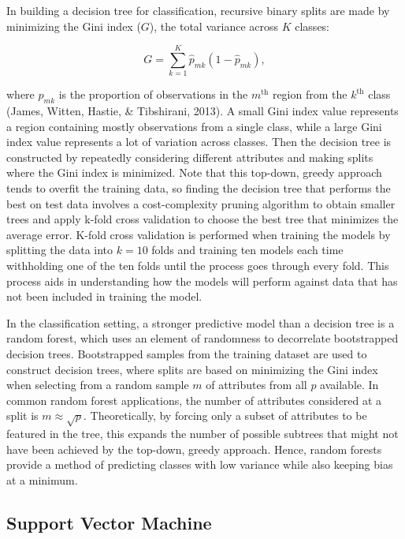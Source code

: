 \documentclass[12pt,twoside]{reedthesis}
\begin{document}
In building a decision tree for classification, recursive binary splits are made by minimizing the Gini index (\(G\)), the total variance across \(K\) classes:

\[G = \sum_{k = 1}^K\hat{p}_{mk}(1 - \hat{p}_{mk}),\]

where \(\hat{p}_{mk}\) is the proportion of observations in the \(m^{\text{th}}\) region from the \(k^{\text{th}}\) class (James, Witten, Hastie, \& Tibshirani, 2013). A small Gini index value represents a region containing mostly observations from a single class, while a large Gini index value represents a lot of variation across classes. Then the decision tree is constructed by repeatedly considering different attributes and making splits where the Gini index is minimized. Note that this top-down, greedy approach tends to overfit the training data, so finding the decision tree that performs the best on test data involves a cost-complexity pruning algorithm to obtain smaller trees and apply k-fold cross validation to choose the best tree that minimizes the average error. K-fold cross validation is performed when training the models by splitting the data into \(k = 10\) folds and training ten models each time withholding one of the ten folds until the process goes through every fold. This process aids in understanding how the models will perform against data that has not been included in training the model.

In the classification setting, a stronger predictive model than a decision tree is a random forest, which uses an element of randomness to decorrelate bootstrapped decision trees. Bootstrapped samples from the training dataset are used to construct decision trees, where splits are based on minimizing the Gini index when selecting from a random sample \(m\) of attributes from all \(p\) available. In common random forest applications, the number of attributes considered at a split is \(m \approx \sqrt{p}\). Theoretically, by forcing only a subset of attributes to be featured in the tree, this expands the number of possible subtrees that might not have been achieved by the top-down, greedy approach. Hence, random forests provide a method of predicting classes with low variance while also keeping bias at a minimum.

\hypertarget{support-vector-machine}{%
\subsection{Support Vector Machine}\label{support-vector-machine}}
\end{document}

